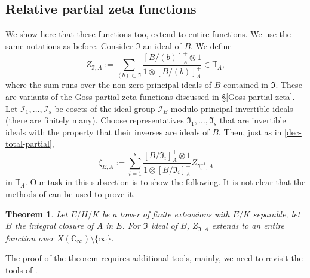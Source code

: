 \documentclass[11pt]{amsart}
\numberwithin{equation}{section}
\newcommand{\CC}{\mathbb{C}}
\newcommand{\TT}{\mathbb{T}}
\newtheorem{Theorem}{Theorem}[section]
\begin{document}
\subsection{Relative partial zeta functions}
We show here that these functions too, extend to entire functions. We use the same notations as before. Consider $\mathfrak{I}$ an ideal of $B$. We define
$$Z_{\mathfrak{I},A}:=\sum_{(b)\subset \mathfrak{I}}\frac{[B/(b)]_A^+\otimes1}{1\otimes [B/(b)]_A^+}\in\TT_A,$$
where the sum runs over the non-zero principal ideals of $B$ contained in $\mathfrak{I}$. 
These are variants of the Goss partial zeta functions discussed in \S \ref{Goss-partial-zeta}. Let 
$\mathcal{I}_1,\ldots,\mathcal{I}_s$ be cosets of the ideal group $\mathcal{I}_B$ modulo principal invertible ideals (there are finitely many). Choose
representatives $\mathfrak{I}_1,\ldots,\mathfrak{I}_s$ that are invertible ideals with the property that their inverses are ideals of $B$.
Then, just as in \eqref{dec-total-partial},
\begin{equation}\label{dec-total-partial-2}
\zeta_{E,A}:=\sum_{i=1}^s\frac{[B/\mathfrak{I}_i]_A^+\otimes1}{1\otimes [B/\mathfrak{I}_i]_A^+}Z_{\mathfrak{I}_i^{-1},A}
\end{equation}
in $\TT_A$.
Our task in this subsection is to show the following. It is not clear that the methods of \cite{ANG&NGO&TAV} can be used to prove it.

\begin{Theorem}\label{lemma-relative-partial-is-entire}
Let $E/H/K$ be a tower of finite extensions with $E/K$ separable, let $B$ the integral closure of $A$ in $E$.
 For $\mathfrak{I}$ ideal of $B$, $Z_{\mathfrak{I},A}$ extends to an entire function over $X(\CC_\infty)\setminus\{\infty\}$.
\end{Theorem}

The proof of the theorem requires additional tools, mainly, we need to revisit the tools of
\cite[Lemma 8.9.3]{GOS}.
\end{document}
